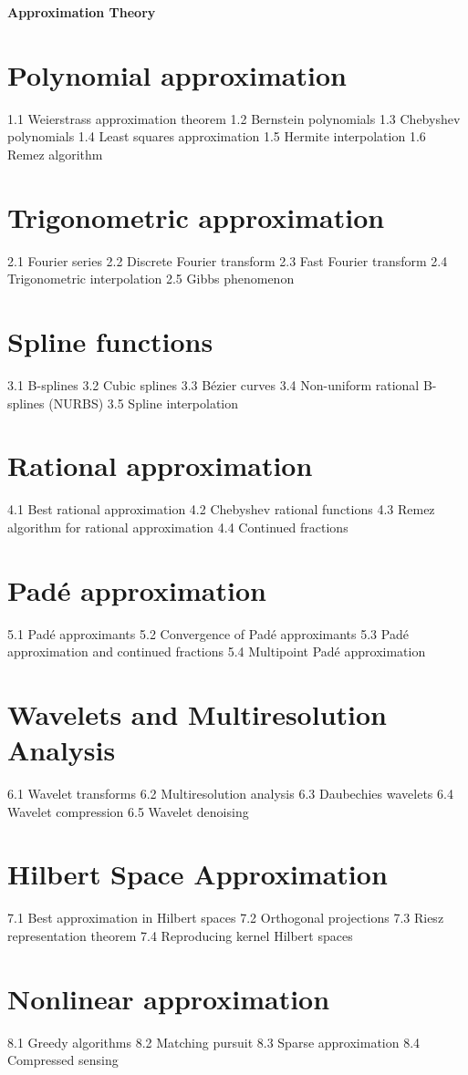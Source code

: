{\LARGE \bf{Approximation Theory}}
\section{Polynomial approximation}
1.1 Weierstrass approximation theorem
1.2 Bernstein polynomials
1.3 Chebyshev polynomials
1.4 Least squares approximation
1.5 Hermite interpolation
1.6 Remez algorithm
\section{Trigonometric approximation}
2.1 Fourier series
2.2 Discrete Fourier transform
2.3 Fast Fourier transform
2.4 Trigonometric interpolation
2.5 Gibbs phenomenon
\section{Spline functions}
3.1 B-splines
3.2 Cubic splines
3.3 Bézier curves
3.4 Non-uniform rational B-splines (NURBS)
3.5 Spline interpolation
\section{Rational approximation}
4.1 Best rational approximation
4.2 Chebyshev rational functions
4.3 Remez algorithm for rational approximation
4.4 Continued fractions
\section{Padé approximation}
5.1 Padé approximants
5.2 Convergence of Padé approximants
5.3 Padé approximation and continued fractions
5.4 Multipoint Padé approximation
\section{Wavelets and Multiresolution Analysis}
6.1 Wavelet transforms
6.2 Multiresolution analysis
6.3 Daubechies wavelets
6.4 Wavelet compression
6.5 Wavelet denoising
\section{Hilbert Space Approximation}
7.1 Best approximation in Hilbert spaces
7.2 Orthogonal projections
7.3 Riesz representation theorem
7.4 Reproducing kernel Hilbert spaces
\section{Nonlinear approximation}
8.1 Greedy algorithms
8.2 Matching pursuit
8.3 Sparse approximation
8.4 Compressed sensing
